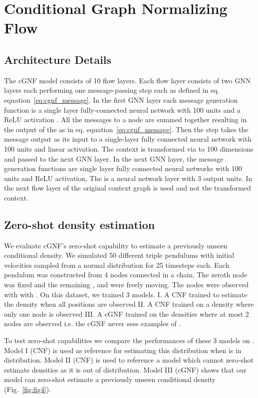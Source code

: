 \documentclass{article} \usepackage{iclr2023_conference,times}
\def\eqref#1{equation~\ref{#1}}
\begin{document}
\section{Conditional Graph Normalizing Flow}
\subsection{Architecture Details}
\label{sec:app_arch_dets}
The cGNF model consists of 10 flow layers.
Each flow layer  consists of two GNN layers each performing one message-passing step each as defined in eq. \eqref{eq:cgnf_message}.
In the first GNN layer each message generation function  is a single layer fully-connected neural network with 100 units and a ReLU activation \citep{agarap2018deep}. All the messages to a node are summed together resulting in the output of the  as in eq. \eqref{eq:cgnf_message}. Then the  step takes the message output as its input to a single-layer fully connected neural network with 100 units and linear activation.
The context  is transformed via  to 100 dimensions and passed to the next GNN layer.
In the next GNN layer, the message generation functions  are single layer fully connected neural networks with 100 units and ReLU activation,
The  is a neural network layer with 3 output units.
In the next flow layer of the original context graph  is used and not the transformed context.

\subsection{Zero-shot density estimation}
\label{sec:zero_shot}
We evaluate cGNF's zero-shot capability to estimate a previously unseen conditional density.
We simulated 50 different triple pendulums with initial velocities sampled from a normal distribution  for 25 timesteps each.
Each pendulum was constructed from 4 nodes connected in a chain. The zeroth node was fixed and the remaining ,  and  were freely moving.
The nodes were observed with  with .
On this dataset, we trained 3 models. I. A CNF trained to estimate the density when all positions are observed  II. A CNF trained on a density where only one node is observed  III. A cGNF trained on the densities where at most 2 nodes are observed i.e. the cGNF never sees examples of .

To test zero-shot capabilities we compare the performances of these 3 models on . Model I (CNF) is used as reference for estimating this distribution when  is in distribution. Model II (CNF) is used to reference a model which cannot zero-shot estimate densities as it is out of distribution. Model III (cGNF) shows that our model can zero-shot estimate a previously unseen conditional density (Fig.~\ref{fig:fig4}).
\end{document}
